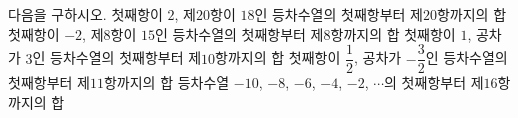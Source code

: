 다음을 구하시오.
 첫째항이 $2$, 제$20$항이 $18$인 등차수열의 첫째항부터 제$20$항까지의 합
 첫째항이 $-2$, 제$8$항이 $15$인 등차수열의 첫째항부터 제$8$항까지의 합
 첫째항이 $1$, 공차가 $3$인 등차수열의 첫째항부터 제$10$항까지의 합
 첫째항이 $\dfrac{1}{2}$, 공차가 $-\dfrac{3}{2}$인 등차수열의 첫째항부터 제$11$항까지의 합
 등차수열 $-10$, $-8$, $-6$, $-4$, $-2$, $\cdots$의 첫째항부터 제$16$항까지의 합
